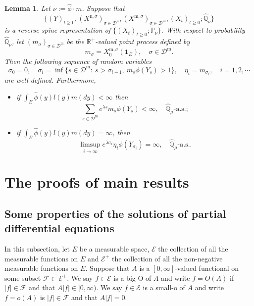 \documentclass[12pt,a4paper]{amsart}
\numberwithin{equation}{section}
\theoremstyle{plain}
\newtheorem{lem}[thm]{Lemma}
\theoremstyle{definition}
\begin{document}
\begin{lem}\label{lem:import_lemma}
Let $\nu := \widehat \phi \cdot m$.
Suppose that
\[\{(Y)_{t\geq 0}, (X^{\mathrm n, \sigma})_{\sigma\in \mathcal D^\mathrm n}, (X^{\mathrm m, \sigma})_{\sigma \in \mathcal D^\mathrm m}, (X_t)_{t\geq 0}; \widehat{\mathbb Q}_{\nu}\}\]
is a reverse spine representation of $\{(X_t)_{t\geq 0}; \widetilde {\mathbb P}_\nu\}$.
With respect to probability $\widehat{\mathbb Q}_\nu$, let $(m_\sigma)_{\sigma\in \mathcal D^{\mathrm m}}$ be the $\mathbb R^+$-valued point process defined by
  \[
    m_\sigma
    = X^{\mathrm m, \sigma}_0(\mathbf 1_E),
    \quad \sigma \in \mathcal D^{\mathrm m}.
  \]
Then the following sequence of random variables
  \[
    \sigma_0=0,\quad \sigma_i=\inf\{s\in\mathcal D^{\mathrm m}:\ s>\sigma_{i-1},\ m_s\phi(Y_s)>1\}, \quad\eta_i=m_{\sigma_i},\quad i=1,2,\cdots
  \]
  are well defined.
  Furthermore, 
  \begin{itemize}
  \item
    if $\int_E\widehat{\phi}(y)l(y)m(dy)<\infty$ then
  \[
    \sum_{s\in\mathcal D^{\mathrm m}} e^{\lambda s}m_s\phi(Y_s)
    < \infty,
    \quad \widehat{\mathbb Q}_{\mu}\text{-a.s.};
  \]
\item
  if $ \int_E\widehat{\phi}(y)l(y)m(dy)=\infty$, then
  \[
    \limsup_{i\rightarrow\infty} e^{\lambda \sigma_i}\eta_i \phi(Y_{\sigma_i})
    =\infty,
    \quad \widehat{\mathbb Q}_{\mu}\text{-a.s.}.
  \]
\end{itemize}
\end{lem}

\section{The proofs of main results}
\subsection{Some properties of the solutions of partial differential equations}
In this subsection, let $E$ be a measurable space, $\mathcal E$ the collection of all the measurable functions on $E$ and $\mathcal E^+$ the collection of all the non-negative measurable functions on $E$.
Suppose that $A$ is a $[0,\infty]$-valued functional on some subset $\mathcal F \subset \mathcal E^+$. 
We say $f \in \mathcal E$ is a big-O of $A$ and write $f = O(A)$ if $|f| \in \mathcal F$ and that $A |f| \in [0,\infty)$.
We say $f \in \mathcal E$ is a small-o of $A$ and write $f = o(A)$ is $|f| \in \mathcal F$ and that $A|f| = 0$.
\end{document}
